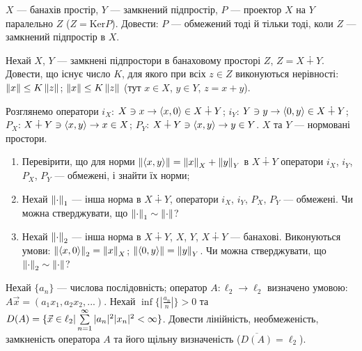 
\begin{exercise}
    $X$ --- банахів простір, $Y$ --- замкнений підпростір, 
    $P$ --- проектор $X$ на $Y$ паралельно $Z$ ($Z = \mathrm{Ker} P$). 
    Довести: $P$ --- обмежений тоді й тільки тоді, коли $Z$ --- 
    замкнений підпростір в $X$.
\end{exercise}

\begin{exercise}
    Нехай $X$, $Y$ --- замкнені підпростори в банаховому просторі $Z$, 
    $Z = X \dotplus Y$. Довести, що існує число $K$, для якого при всіх $z \in Z$ 
    виконуються нерівності: $\left\lVert x\right\rVert \leq K\left\lVert z\right\rVert$; $\left\lVert x\right\rVert \leq K\left\lVert z\right\rVert$ (тут 
    $x \in X$, $y \in Y$, $z = x + y$). 
\end{exercise}

\begin{exercise}
    Розглянемо оператори $i_X$: $X \ni x \rightarrow 
    \left<x, 0\right> \in X \dotplus Y$;
    $i_Y$: $Y \ni y \rightarrow 
    \left<0, y\right> \in X \dotplus Y$;
    $P_X$: $X \dotplus Y \ni \left<x, y\right> \rightarrow 
    x \in X $;
    $P_Y$: $X \dotplus Y \ni \left<x, y\right> \rightarrow 
    y \in Y $. $X$ та $Y$ --- нормовані простори.
    \begin{enumerate}
        \item Перевірити, що для норми $\left\lVert\left<x, y\right>\right\rVert = 
        \left\lVert x\right\rVert_X + \left\lVert y\right\rVert_Y$ в $X \dotplus Y$ оператори $i_X$, $i_Y$, 
        $P_X$, $P_Y$ --- обмежені, і знайти їх норми;
        \item Нехай $\left\lVert\cdot\right\rVert_1$ --- інша норма в $X \dotplus Y$, 
        оператори $i_X$, $i_Y$, $P_X$, $P_Y$ --- обмежені. Чи можна 
        стверджувати, що $\left\lVert\cdot\right\rVert_1 \sim \left\lVert\cdot\right\rVert$?
        \item Нехай $\left\lVert\cdot\right\rVert_2$ --- інша норма в $X \dotplus Y$,
        $X$, $Y$, $X \dotplus Y$ --- банахові. Виконуються умови: 
        $\left\lVert\left<x, 0\right>\right\rVert_2 = \left\lVert x\right\rVert_X$; $\left\lVert\left<0, y\right>\right\rVert 
        = \left\lVert y\right\rVert_Y$. Чи можна 
        стверджувати, що $\left\lVert\cdot\right\rVert_2 \sim \left\lVert\cdot\right\rVert$?
    \end{enumerate}
\end{exercise}

\begin{exercise}\label{N:2_1_18}
    Нехай $\{a_n\}$ --- числова послідовність; оператор $A: \ell_2 
    \rightarrow \ell_2$ визначено умовою: $A\vec{x} = 
    (a_1x_1, a_2x_2, ...)$. Нехай $\inf\{|\frac{a_n}{n}|\} > 0$ та 
    $D(A) = \{\vec{x} \in \ell_2 | \sum\limits_{n=1}^{\infty}|a_n|^2|x_n|^2 
    < \infty\}$. Довести лінійність, необмеженість, замкненість оператора 
    $A$ та його щільну визначеність ($\overline{D(A)} = \ell_2$).
\end{exercise}

